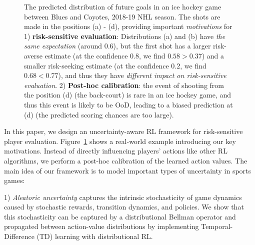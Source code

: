 \documentclass{article}
\begin{document}
\begin{figure}
    \caption{
    The predicted distribution of future goals in an ice hockey game between Blues and Coyotes, 2018-19 NHL season. The shots are made in the positions (a) - (d), providing important {\it motivations} for 1) {\bf risk-sensitive evaluation}: Distributions (a) and (b) have {\it the same expectation} (around 0.6), but the first shot has a larger risk-averse estimate (at the confidence $0.8$, we find $0.58 > 0.37$) and a smaller risk-seeking estimate (at the confidence $0.2$, we find $0.68 < 0.77$), and thus they have {\it different impact on risk-sensitive evaluation}. 2) {\bf Post-hoc calibration}: the event of shooting from the position (d) (the back-court) is rare in an ice hockey game, and thus this event is likely to be OoD, leading to a biased prediction at (d) (the predicted scoring chances are too large).
    }
    \label{fig:examples-distribution-ice-hockey}
    \vspace{-0.15in}
\end{figure}

In this paper, we design an uncertainty-aware RL framework for risk-sensitive player evaluation. Figure~\ref{fig:examples-distribution-ice-hockey} shows a real-world example introducing our key motivations. Instead of directly influencing players' actions like other RL algorithms, we perform a post-hoc calibration of the learned action values. The main idea of our framework is to model important types of uncertainty in sports games: 

1) {\it Aleatoric uncertainty} captures the intrinsic stochasticity of game dynamics caused by stochastic rewards, transition dynamics, and policies. We show that this stochasticity can be captured by a distributional Bellman operator and propagated between action-value distributions by implementing Temporal-Difference (TD) learning with distributional RL.
  
\end{document}
